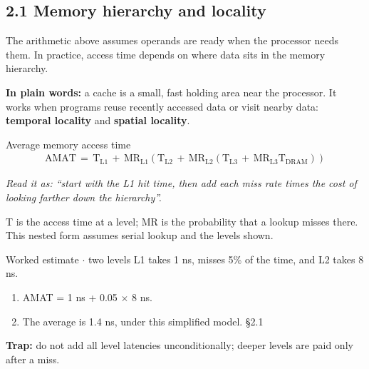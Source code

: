 \documentclass[11pt]{article}
\begin{document}
\begin{keepsection}
\section{2.1 Memory hierarchy and locality}

The arithmetic above assumes operands are ready when the processor needs them. In practice, access time depends on where data sits in the memory hierarchy.

\begin{plainbox}\textbf{In plain words:} a cache is a small, fast holding area near the processor. It works when programs reuse recently accessed data or visit nearby data: \textbf{temporal locality} and \textbf{spatial locality}.\end{plainbox}

\begin{equationcard}{Average memory access time}
\[ \begin{gathered} \text{AMAT}\, =\, \mathrm{T}_{\mathrm{L}1}\, +\, \text{MR}_{\mathrm{L}1}(\mathrm{T}_{\mathrm{L}2}\, +\, \text{MR}_{\mathrm{L}2}(\mathrm{T}_{\mathrm{L}3}\, +\, \text{MR}_{\mathrm{L}3}\mathrm{T}_{\text{DRAM}})) \end{gathered} \]
{\small \emph{Read it as: “start with the L1 hit time, then add each miss rate times the cost of looking farther down the hierarchy”.}\par T is the access time at a level; MR is the probability that a lookup misses there. This nested form assumes serial lookup and the levels shown.}
\end{equationcard}

\begin{workedbox}{Worked estimate \ensuremath{\cdot} two levels}
L1 takes 1 ns, misses 5\% of the time, and L2 takes 8 ns.

\begin{enumerate}
\item AMAT = 1 ns + 0.05 \ensuremath{\times} 8 ns.
\item The average is 1.4 ns, under this simplified model. \hfill{\small\color{FAUblue}§2.1}
\end{enumerate}
\end{workedbox}

\begin{notebox}\textbf{Trap:} do not add all level latencies unconditionally; deeper levels are paid only after a miss.\end{notebox}


\end{keepsection}
\end{document}
